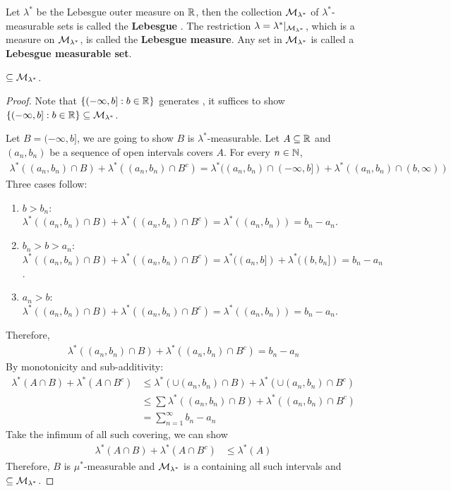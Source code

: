 \documentclass[11pt]{article}
\begin{document}
	\begin{definition}
		Let $\lambda^*$ be the Lebesgue outer measure on $\mathbb{R}$, then the collection $\mathcal{{M}}_{\lambda^*}$ of $\lambda^*$-measurable sets is called the \textbf{Lebesgue \salg}. The restriction $\lambda = \lambda^*|_{\mathcal{{M}}_{\lambda^*}}$, which is a measure on $\mathcal{{M}}_{\lambda^*}$, is called the \textbf{Lebesgue measure}. Any set in $\mathcal{{M}}_{\lambda^*}$ is called a \textbf{Lebesgue measurable set}.
	\end{definition}
	
	\begin{theorem}
		\br $\subseteq \mathcal{{M}}_{\lambda^*}$.
		\begin{proof}
			Note that $\{(-\infty, b]:b\in\mathbb{R}\}$ generates \br, it suffices to show $\{(-\infty, b]:b\in\mathbb{R}\} \subseteq \mathcal{{M}}_{\lambda^*}$.
			
			Let $B = (-\infty, b]$, we are going to show $B$ is $\lambda^*$-measurable. Let $A \subseteq \mathbb{R}$ and $(a_n, b_n)$ be a sequence of open intervals covers $A$. For every $n \in \mathbb{N}$,
			\begin{align}
				\lambda^*((a_n, b_n) \cap B) + \lambda^*((a_n, b_n) \cap B^c) = \lambda^*((a_n, b_n) \cap (-\infty, b]) + \lambda^*((a_n, b_n) \cap (b, \infty))
			\end{align}
			Three cases follow:
			\begin{enumerate}
				\item $b > b_n$: $\lambda^*((a_n, b_n) \cap B) + \lambda^*((a_n, b_n) \cap B^c) = \lambda^*((a_n, b_n)) = b_n - a_n$.
				\item $b_n > b > a_n$:  $\lambda^*((a_n, b_n) \cap B) + \lambda^*((a_n, b_n) \cap B^c) = \lambda^*((a_n, b]) + \lambda^*((b, b_n]) = b_n - a_n$.
				\item $a_n > b$: $\lambda^*((a_n, b_n) \cap B) + \lambda^*((a_n, b_n) \cap B^c) = \lambda^*((a_n, b_n)) = b_n - a_n$.
			\end{enumerate}
			Therefore,
			\begin{align}
				\lambda^*((a_n, b_n) \cap B) + \lambda^*((a_n, b_n) \cap B^c) = b_n - a_n
			\end{align}
			By monotonicity and sub-additivity:
			\begin{align}
				\lambda^*(A \cap B) + \lambda^*(A \cap B^c) &\leq \lambda^*(\cup (a_n, b_n) \cap B) + \lambda^* (\cup (a_n, b_n) \cap B^c ) \\
				&\leq \sum \lambda^*((a_n, b_n) \cap B) + \lambda^*((a_n, b_n) \cap B^c) \\
				&= \sum_{n=1}^\infty b_n - a_n
			\end{align}
			Take the infimum of all such covering, we can show
			\begin{align}
				\lambda^*(A \cap B) + \lambda^*(A \cap B^c) &\leq \lambda^*(A)
			\end{align}
			Therefore, $B$ is $\mu^*$-measurable and $\mathcal{{M}}_{\lambda^*}$ is a \salg containing all such intervals and \br $\subseteq \mathcal{{M}}_{\lambda^*}$.
		\end{proof}
	\end{theorem}
	
\end{document}
